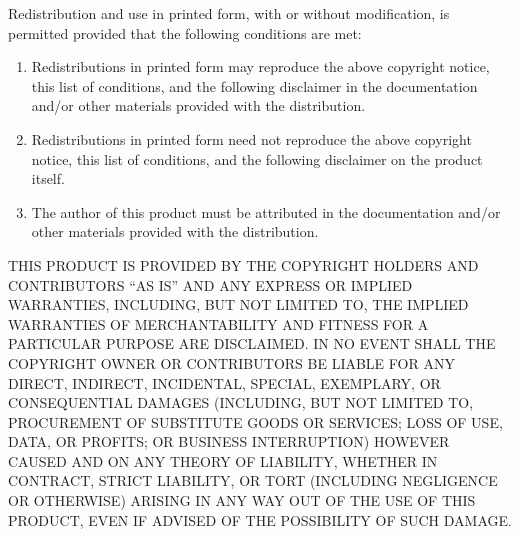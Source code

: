 \documentclass[a4paper,english]{report}
\numberwithin{equation}{section}
\begin{document}
Redistribution and use in printed form, with or without modification,
is permitted provided that the following conditions are met:

\begin{enumerate}
\item Redistributions in printed form may reproduce the above copyright
   notice, this list of conditions, and the following disclaimer in the
   documentation and/or other materials provided with the distribution.
\item Redistributions in printed form need not reproduce the above
   copyright notice, this list of conditions, and the following
   disclaimer on the product itself.
\item The author of this product must be attributed in the documentation
   and/or other materials provided with the distribution.
\end{enumerate}

THIS PRODUCT IS PROVIDED BY THE COPYRIGHT HOLDERS AND CONTRIBUTORS
“AS IS” AND ANY EXPRESS OR IMPLIED WARRANTIES, INCLUDING, BUT NOT
LIMITED TO, THE IMPLIED WARRANTIES OF MERCHANTABILITY AND FITNESS FOR
A PARTICULAR PURPOSE ARE DISCLAIMED.  IN NO EVENT SHALL THE COPYRIGHT
OWNER OR CONTRIBUTORS BE LIABLE FOR ANY DIRECT, INDIRECT, INCIDENTAL,
SPECIAL, EXEMPLARY, OR CONSEQUENTIAL DAMAGES (INCLUDING, BUT NOT
LIMITED TO, PROCUREMENT OF SUBSTITUTE GOODS OR SERVICES; LOSS OF USE,
DATA, OR PROFITS; OR BUSINESS INTERRUPTION) HOWEVER CAUSED AND ON ANY
THEORY OF LIABILITY, WHETHER IN CONTRACT, STRICT LIABILITY, OR TORT
(INCLUDING NEGLIGENCE OR OTHERWISE) ARISING IN ANY WAY OUT OF THE USE
OF THIS PRODUCT, EVEN IF ADVISED OF THE POSSIBILITY OF SUCH DAMAGE.
\end{document}
